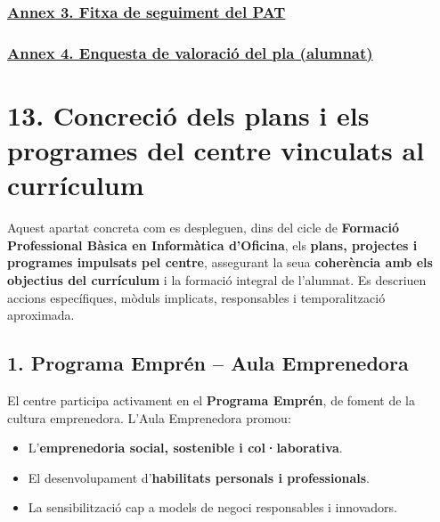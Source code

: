 \documentclass[
  paper=a4,
  ,captions=tableheading
]{scrartcl}
\providecommand{\tightlist}{%
  \setlength{\itemsep}{0pt}\setlength{\parskip}{0pt}}
\begin{document}
\hypertarget{annex-3.-fitxa-de-seguiment-del-pat}{%
\subsubsection{\texorpdfstring{\href{../annexos/Annex3-SeguimentPAT/}{Annex
3. Fitxa de seguiment del
PAT}}{Annex 3. Fitxa de seguiment del PAT}}\label{annex-3.-fitxa-de-seguiment-del-pat}}

\hypertarget{annex-4.-enquesta-de-valoraciuxf3-del-pla-alumnat}{%
\subsubsection{\texorpdfstring{\href{../annexos/Annex4-EnquestaAlumnat/}{Annex
4. Enquesta de valoració del pla
(alumnat)}}{Annex 4. Enquesta de valoració del pla (alumnat)}}\label{annex-4.-enquesta-de-valoraciuxf3-del-pla-alumnat}}

\hypertarget{concreciuxf3-dels-plans-i-els-programes-del-centre-vinculats-al-curruxedculum}{%
\section{13. Concreció dels plans i els programes del centre vinculats
al
currículum}\label{concreciuxf3-dels-plans-i-els-programes-del-centre-vinculats-al-curruxedculum}}

Aquest apartat concreta com es despleguen, dins del cicle de
\textbf{Formació Professional Bàsica en Informàtica d'Oficina}, els
\textbf{plans, projectes i programes impulsats pel centre}, assegurant
la seua \textbf{coherència amb els objectius del currículum} i la
formació integral de l'alumnat. Es descriuen accions específiques,
mòduls implicats, responsables i temporalització aproximada.

\hypertarget{programa-empruxe9n-aula-emprenedora}{%
\subsection{1. Programa Emprén -- Aula
Emprenedora}\label{programa-empruxe9n-aula-emprenedora}}

El centre participa activament en el \textbf{Programa Emprén}, de foment
de la cultura emprenedora. L'Aula Emprenedora promou:

\begin{itemize}
\tightlist
\item
  L'\textbf{emprenedoria social, sostenible i col·laborativa}.
\item
  El desenvolupament d'\textbf{habilitats personals i professionals}.
\item
  La sensibilització cap a models de negoci responsables i innovadors.
\end{itemize}
\end{document}
